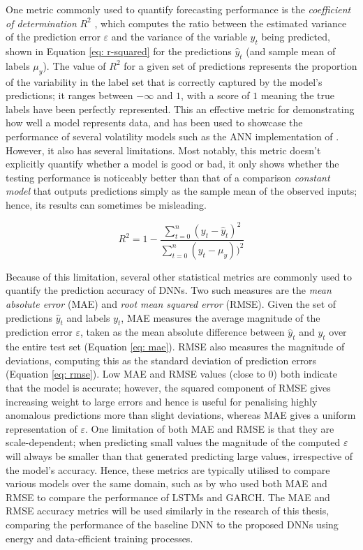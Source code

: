 \documentclass[a4paper, 11pt]{report}
\begin{document}
    One metric commonly used to quantify forecasting performance is the \emph{coefficient of determination} $R^2$ \citep{zhang-2022}, which computes the ratio between the estimated variance of the prediction error $\varepsilon$ and the variance of the variable $y_t$ being predicted, shown in Equation \ref{eq: r-squared} for the predictions $\hat{y}_t$ (and sample mean of labels $\mu_{y}$). The value of $R^2$ for a given set of predictions represents the proportion of the variability in the label set that is correctly captured by the model's predictions; it ranges between $- \infty$ and $1$, with a score of $1$ meaning the true labels have been perfectly represented. This an effective metric for demonstrating how well a model represents data, and has been used to showcase the performance of several volatility models such as the ANN implementation of \citet{zhang-2022}. However, it also has several limitations. Most notably, this metric doesn't explicitly quantify whether a model is good or bad, it only shows whether the testing performance is noticeably better than that of a comparison \emph{constant model} that outputs predictions simply as the sample mean of the observed inputs; hence, its results can sometimes be misleading.


    \begin{equation}
        \label{eq: r-squared}
        R^2 = 1 - \frac{\sum_{t=0}^n (y_t - \hat{y}_t)^2}{\sum_{t=0}^n (y_t - \mu_{y}))^2}
    \end{equation}


    Because of this limitation, several other statistical metrics are commonly used to quantify the prediction accuracy of DNNs. Two such measures are the \emph{mean absolute error} (MAE) and \emph{root mean squared error} (RMSE). Given the set of predictions $\hat{y}_t$ and labels $y_t$, MAE measures the average magnitude of the prediction error $\varepsilon$, taken as the mean absolute difference between $\hat{y}_t$ and $y_t$ over the entire test set (Equation \ref{eq: mae}). RMSE also measures the magnitude of deviations, computing this as the standard deviation of prediction errors (Equation \ref{eq: rmse}). Low MAE and RMSE values (close to $0$) both indicate that the model is accurate; however, the squared component of RMSE gives increasing weight to large errors and hence is useful for penalising highly anomalous predictions more than slight deviations, whereas MAE gives a uniform representation of $\varepsilon$. One limitation of both MAE and RMSE is that they are scale-dependent; when predicting small values the magnitude of the computed $\varepsilon$ will always be smaller than that generated predicting large values, irrespective of the model's accuracy. Hence, these metrics are typically utilised to compare various models over the same domain, such as by \citet{rodikov-2022} who used both MAE and RMSE to compare the performance of LSTMs and GARCH. The MAE and RMSE accuracy metrics will be used similarly in the research of this thesis, comparing the performance of the baseline DNN to the proposed DNNs using energy and data-efficient training processes. 
\end{document}
